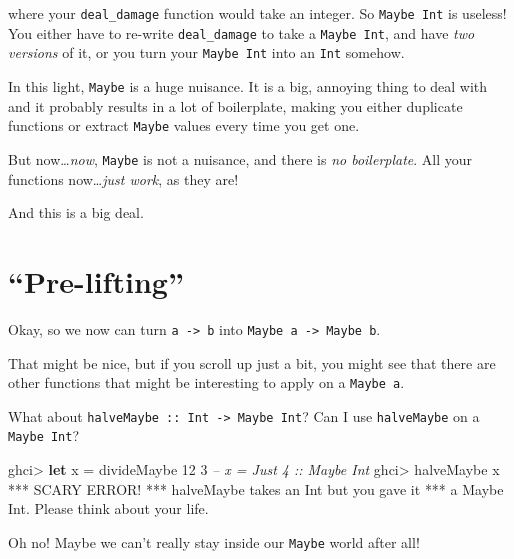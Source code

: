 \documentclass[]{article}
\newenvironment{Shaded}{}{}
\newcommand{\KeywordTok}[1]{\textcolor[rgb]{0.00,0.44,0.13}{\textbf{{#1}}}}
\newcommand{\DataTypeTok}[1]{\textcolor[rgb]{0.56,0.13,0.00}{{#1}}}
\newcommand{\DecValTok}[1]{\textcolor[rgb]{0.25,0.63,0.44}{{#1}}}
\newcommand{\CommentTok}[1]{\textcolor[rgb]{0.38,0.63,0.69}{\textit{{#1}}}}
\newcommand{\FunctionTok}[1]{\textcolor[rgb]{0.02,0.16,0.49}{{#1}}}
\newcommand{\NormalTok}[1]{{#1}}
\begin{document}
where your \texttt{deal\_damage} function would take an integer. So
\texttt{Maybe\ Int} is useless! You either have to re-write
\texttt{deal\_damage} to take a \texttt{Maybe\ Int}, and have \emph{two
versions} of it, or you turn your \texttt{Maybe\ Int} into an
\texttt{Int} somehow.

In this light, \texttt{Maybe} is a huge nuisance. It is a big, annoying
thing to deal with and it probably results in a lot of boilerplate,
making you either duplicate functions or extract \texttt{Maybe} values
every time you get one.

But now\ldots{}\emph{now}, \texttt{Maybe} is not a nuisance, and there
is \emph{no boilerplate}. All your functions now\ldots{}\emph{just
work}, as they are!

And this is a big deal.

\section{\texorpdfstring{``Pre-lifting''}{Pre-lifting}}\label{pre-lifting}

Okay, so we now can turn \texttt{a\ -\textgreater{}\ b} into
\texttt{Maybe\ a\ -\textgreater{}\ Maybe\ b}.

That might be nice, but if you scroll up just a bit, you might see that
there are other functions that might be interesting to apply on a
\texttt{Maybe\ a}.

What about \texttt{halveMaybe\ ::\ Int\ -\textgreater{}\ Maybe\ Int}?
Can I use \texttt{halveMaybe} on a \texttt{Maybe\ Int}?

\begin{Shaded}
\begin{Highlighting}[]
\NormalTok{ghci}\FunctionTok{>} \KeywordTok{let} \NormalTok{x }\FunctionTok{=} \NormalTok{divideMaybe }\DecValTok{12} \DecValTok{3}     \CommentTok{-- x = Just 4 :: Maybe Int}
\NormalTok{ghci}\FunctionTok{>} \NormalTok{halveMaybe x}
\FunctionTok{***} \DataTypeTok{SCARY} \DataTypeTok{ERROR}\FunctionTok{!}
\FunctionTok{***} \NormalTok{halveMaybe takes an }\DataTypeTok{Int} \NormalTok{but you gave it}
\FunctionTok{***} \NormalTok{a }\DataTypeTok{Maybe} \DataTypeTok{Int}\FunctionTok{.}  \DataTypeTok{Please} \NormalTok{think about your life}\FunctionTok{.}
\end{Highlighting}
\end{Shaded}

Oh no! Maybe we can't really stay inside our \texttt{Maybe} world after
all!
\end{document}
